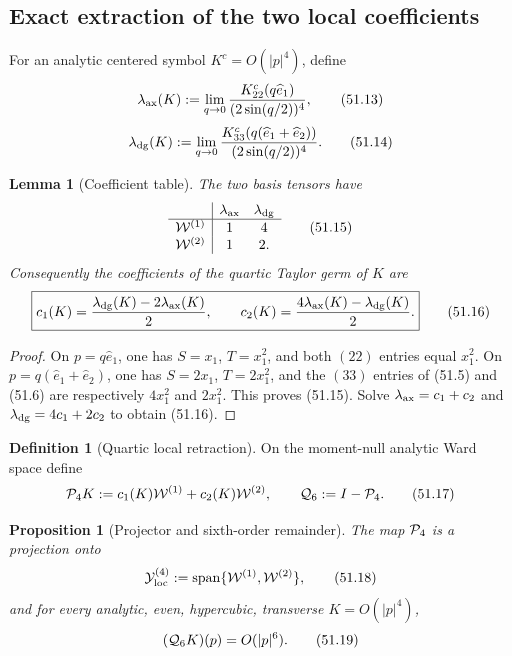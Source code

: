 \documentclass[11pt,oneside]{book}
\newtheorem{lemma}[theorem]{Lemma}
\newtheorem{proposition}[theorem]{Proposition}
\theoremstyle{definition}
\newtheorem{definition}[theorem]{Definition}
\theoremstyle{remark}
\begin{document}
\subsection{Exact extraction of the two local coefficients}

For an analytic centered symbol \(K^c=O(|p|^4)\), define
\[
 \lambda_{\rm ax}(K)
 :=\lim_{q\to0}
 \frac{K^c_{22}(q\widehat e_1)}{(2\sin(q/2))^4},              \tag{51.13}
\]
\[
 \lambda_{\rm dg}(K)
 :=\lim_{q\to0}
 \frac{K^c_{33}(q(\widehat e_1+\widehat e_2))}
      {(2\sin(q/2))^4}.                                      \tag{51.14}
\]

\begin{lemma}[Coefficient table]
\label{lem:e8v51-coefficient-table}
The two basis tensors have
\[
\begin{array}{c|cc}
 &\lambda_{\rm ax}&\lambda_{\rm dg}\\ \hline
 {\cal W}^{(1)}&1&4\\
 {\cal W}^{(2)}&1&2.
\end{array}                                                    \tag{51.15}
\]
Consequently the coefficients of the quartic Taylor germ of \(K\)
are
\[
 \boxed{
 c_1(K)=\frac{\lambda_{\rm dg}(K)-2\lambda_{\rm ax}(K)}2,
 \qquad
 c_2(K)=\frac{4\lambda_{\rm ax}(K)-\lambda_{\rm dg}(K)}2.}     \tag{51.16}
\]
\end{lemma}

\begin{proof}
On \(p=q\widehat e_1\), one has \(S=x_1\), \(T=x_1^2\), and both
\((22)\) entries equal \(x_1^2\).  On
\(p=q(\widehat e_1+\widehat e_2)\), one has
\(S=2x_1\), \(T=2x_1^2\), and the \((33)\) entries of (51.5) and
(51.6) are respectively \(4x_1^2\) and \(2x_1^2\).
This proves (51.15).  Solve
\(\lambda_{\rm ax}=c_1+c_2\) and
\(\lambda_{\rm dg}=4c_1+2c_2\) to obtain (51.16).
\end{proof}

\begin{definition}[Quartic local retraction]
\label{def:e8v51-quartic-retraction}
On the moment-null analytic Ward space define
\[
 {\cal P}_4K
 :=c_1(K){\cal W}^{(1)}+c_2(K){\cal W}^{(2)},\qquad
 {\cal Q}_6:=I-{\cal P}_4.                                   \tag{51.17}
\]
\end{definition}

\begin{proposition}[Projector and sixth-order remainder]
\label{prop:e8v51-sixth-remainder}
The map \({\cal P}_4\) is a projection onto
\[
 {\cal Y}_{\rm loc}^{(4)}
 :=\operatorname{span}\{{\cal W}^{(1)},{\cal W}^{(2)}\},       \tag{51.18}
\]
and for every analytic, even, hypercubic, transverse
\(K=O(|p|^4)\),
\[
 ({\cal Q}_6K)(p)=O(|p|^6).                                  \tag{51.19}
\]
\end{proposition}
\end{document}
